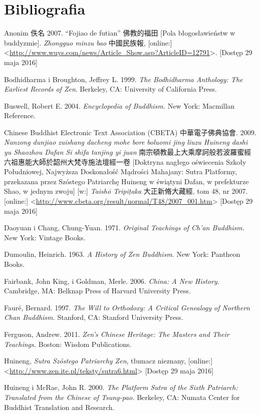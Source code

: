 \onecolumn
\chapter*{Bibliografia}
Anonim 佚名 2007. ``Fojiao de futian'' 佛教的福田 [Pola błogosławieństw w buddyzmie]. \textit{Zhongguo minzu bao} 中國民族報, [online:] <\url{http://www.wuys.com/news/Article_Show.asp?ArticleID=12791}>. [Dostęp 29 maja 2016]

Bodhidharma i Broughton, Jeffrey L. 1999. \textit{The Bodhidharma Anthology: The Earliest Records of Zen}. Berkeley, CA: University of California Press.

Buswell, Robert E. 2004. \textit{Encyclopedia of Buddhism.} New York: Macmillan Reference.

Chinese Buddhist Electronic Text Association (CBETA) 中華電子佛典協會. 2009. \textit{Nanzong dunjiao zuishang dacheng mohe bore boluomi jing liuzu Huineng dashi yu Shaozhou Dafan Si shifa tanjing yi juan} 南宗頓教最上大乘摩訶般若波羅蜜經六祖惠能大師於韶州大梵寺施法壇經一卷 [Doktryna nagłego oświecenia Szkoły Południowej, Najwyższa Doskonałość Mądrości Mahajany: Sutra Platformy, przekazana przez Szóstego Patriarchę Huineng w świątyni Dafan, w prefekturze Shao, w jednym zwoju] [w:] \textit{Taishō Tripi\d{t}aka} 大正新脩大藏經, tom 48, nr 2007. [online:] <\url{http://www.cbeta.org/result/normal/T48/2007_001.htm}> [Dostęp 29 maja 2016]

Daoyuan i Chang, Chung-Yuan. 1971. \textit{Original Teachings of Ch'an Buddhism.} New York: Vintage Books.

Dumoulin, Heinrich. 1963. \textit{A History of Zen Buddhism}. New York: Pantheon Books.

Fairbank, John King, i Goldman, Merle. 2006. \textit{China: A New History.} Cambridge, MA: Belknap Press of Harvard University Press.

Fauré, Bernard. 1997. \textit{The Will to Orthodoxy: A Critical Genealogy of Northern Chan Buddhism.} Stanford, CA: Stanford University Press.

Ferguson, Andrew. 2011. \textit{Zen's Chinese Heritage: The Masters and Their Teachings.} Boston: Wisdom Publications.

Huineng, \textit{Sutra Szóstego Patriarchy Zen}, tłumacz nieznany, [online:] <\url{http://www.zen.ite.pl/teksty/sutra6.html}> [Dostęp 29 maja 2016]

Huineng i McRae, John R. 2000. \textit{The Platform Sutra of the Sixth Patriarch: Translated from the Chinese of Tsung-pao.} Berkeley, CA: Numata Center for Buddhist Translation and Research.

